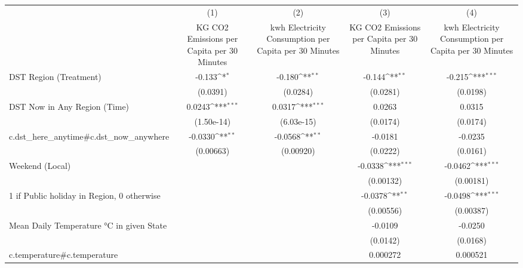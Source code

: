 {
\def\sym#1{\ifmmode^{#1}\else\(^{#1}\)\fi}
\begin{tabular}{l*{4}{c}}
\hline\hline
                    &\multicolumn{1}{c}{(1)}&\multicolumn{1}{c}{(2)}&\multicolumn{1}{c}{(3)}&\multicolumn{1}{c}{(4)}\\
                    &\multicolumn{1}{c}{KG CO2 Emissions per Capita per 30 Minutes}&\multicolumn{1}{c}{kwh Electricity Consumption per Capita per 30 Minutes}&\multicolumn{1}{c}{KG CO2 Emissions per Capita per 30 Minutes}&\multicolumn{1}{c}{kwh Electricity Consumption per Capita per 30 Minutes}\\
\hline
DST Region (Treatment)&      -0.133\sym{*}  &      -0.180\sym{**} &      -0.144\sym{**} &      -0.215\sym{***}\\
                    &    (0.0391)         &    (0.0284)         &    (0.0281)         &    (0.0198)         \\
[1em]
DST Now in Any Region (Time)&      0.0243\sym{***}&      0.0317\sym{***}&      0.0263         &      0.0315         \\
                    &  (1.50e-14)         &  (6.03e-15)         &    (0.0174)         &    (0.0174)         \\
[1em]
c.dst\_here\_anytime#c.dst\_now\_anywhere&     -0.0330\sym{**} &     -0.0568\sym{**} &     -0.0181         &     -0.0235         \\
                    &   (0.00663)         &   (0.00920)         &    (0.0222)         &    (0.0161)         \\
[1em]
Weekend (Local)     &                     &                     &     -0.0338\sym{***}&     -0.0462\sym{***}\\
                    &                     &                     &   (0.00132)         &   (0.00181)         \\
[1em]
1 if Public holiday in Region, 0 otherwise&                     &                     &     -0.0378\sym{**} &     -0.0498\sym{***}\\
                    &                     &                     &   (0.00556)         &   (0.00387)         \\
[1em]
Mean Daily Temperature °C in given State&                     &                     &     -0.0109         &     -0.0250         \\
                    &                     &                     &    (0.0142)         &    (0.0168)         \\
[1em]
c.temperature#c.temperature&                     &                     &    0.000272         &    0.000521         \\

\end{tabular}}
